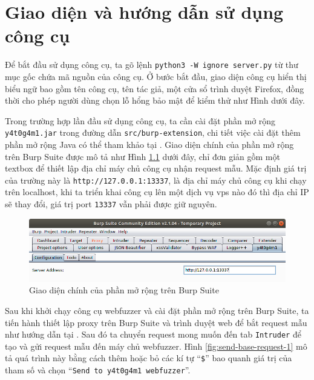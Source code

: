 \cleardoublepage
\appendix
\chapter{Giao diện và hướng dẫn sử dụng công cụ}
Để bắt đầu sử dụng công cụ, ta gõ lệnh \texttt{python3 -W ignore server.py} từ thư mục gốc chứa mã nguồn của công cụ. Ở bước bắt đầu, giao diện công cụ hiển thị biểu ngữ bao gồm tên công cụ, tên tác giả, một cửa sổ trình duyệt Firefox, đồng thời cho phép người dùng chọn lỗ hổng bảo mật để kiểm thử như Hình  dưới đây.

Trong trường hợp lần đầu sử dụng công cụ, ta cần cài đặt phần mở rộng \texttt{y4t0g4m1.jar} trong đường dẫn \texttt{src/burp-extension}, chi tiết việc cài đặt thêm phần mở rộng Java có thể tham khảo tại \parencite{burp-suite-extension-setup}. Giao diện chính của phần mở rộng trên Burp Suite được mô tả như Hình \ref{fig:main-burp-extension-interface} dưới đây, chỉ đơn giản gồm một textbox để thiết lập địa chỉ máy chủ công cụ nhận request mẫu. Mặc định giá trị của trường này là \texttt{http://127.0.0.1:13337}, là địa chỉ máy chủ công cụ khi chạy trên localhost, khi ta triển khai công cụ lên một dịch vụ vps nào đó thì địa chỉ IP sẽ thay đổi, giá trị port \texttt{13337} vẫn phải được giữ nguyên. 
\begin{figure}[H]
  \centering
    \includegraphics[width=\textwidth,keepaspectratio=true]{images/main-burp-extension-interface.png}
  \caption{Giao diện chính của phần mở rộng trên Burp Suite}
  \label{fig:main-burp-extension-interface}
\end{figure}
Sau khi khởi chạy công cụ webfuzzer và cài đặt phần mở rộng trên Burp Suite, ta tiến hành thiết lập proxy trên Burp Suite và trình duyệt web để bắt request mẫu như hướng dẫn tại \parencite{burp-suite-proxy}. Sau đó ta chuyển request mong muốn đến tab \texttt{Intruder} để tạo và gửi request mẫu đến máy chủ webfuzzer. Hình \ref{fig:send-base-request-1} mô tả quá trình này bằng cách thêm hoặc bỏ các kí tự ``\texttt{\$}'' bao quanh giá trị của tham số và chọn ``\texttt{Send to y4t0g4m1 webfuzzer}''.

